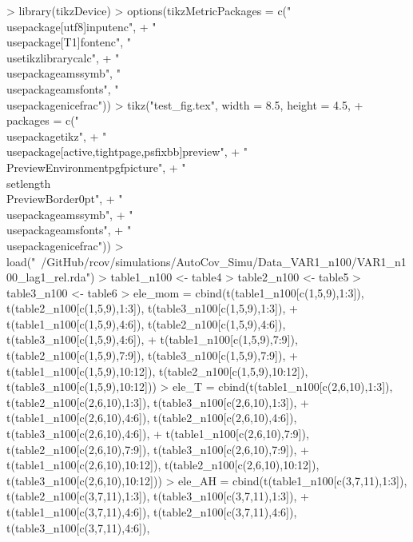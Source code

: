 \documentclass{article}
\begin{document}


\begin{Schunk}
\begin{Sinput}
> library(tikzDevice)
> options(tikzMetricPackages = c("\\usepackage[utf8]{inputenc}",
+     "\\usepackage[T1]{fontenc}", "\\usetikzlibrary{calc}",
+     "\\usepackage{amssymb}", "\\usepackage{amsfonts}", "\\usepackage{nicefrac}"))
> tikz("test_fig.tex", width = 8.5, height = 4.5,
+      packages = c("\\usepackage{tikz}",
+                  "\\usepackage[active,tightpage,psfixbb]{preview}",
+                  "\\PreviewEnvironment{pgfpicture}",
+                  "\\setlength\\PreviewBorder{0pt}",
+                  "\\usepackage{amssymb}",
+                  "\\usepackage{amsfonts}",
+                  "\\usepackage{nicefrac}"))
> load("~/GitHub/rcov/simulations/AutoCov_Simu/Data_VAR1_n100/VAR1_n100_lag1_rel.rda")
> table1_n100 <- table4
> table2_n100 <- table5
> table3_n100 <- table6
> ele_mom = cbind(t(table1_n100[c(1,5,9),1:3]), t(table2_n100[c(1,5,9),1:3]), t(table3_n100[c(1,5,9),1:3]),
+                 t(table1_n100[c(1,5,9),4:6]), t(table2_n100[c(1,5,9),4:6]), t(table3_n100[c(1,5,9),4:6]),
+                 t(table1_n100[c(1,5,9),7:9]), t(table2_n100[c(1,5,9),7:9]), t(table3_n100[c(1,5,9),7:9]),
+                 t(table1_n100[c(1,5,9),10:12]), t(table2_n100[c(1,5,9),10:12]), t(table3_n100[c(1,5,9),10:12]))
> ele_T = cbind(t(table1_n100[c(2,6,10),1:3]), t(table2_n100[c(2,6,10),1:3]), t(table3_n100[c(2,6,10),1:3]),
+               t(table1_n100[c(2,6,10),4:6]), t(table2_n100[c(2,6,10),4:6]), t(table3_n100[c(2,6,10),4:6]),
+               t(table1_n100[c(2,6,10),7:9]), t(table2_n100[c(2,6,10),7:9]), t(table3_n100[c(2,6,10),7:9]),
+               t(table1_n100[c(2,6,10),10:12]), t(table2_n100[c(2,6,10),10:12]), t(table3_n100[c(2,6,10),10:12]))
> ele_AH = cbind(t(table1_n100[c(3,7,11),1:3]), t(table2_n100[c(3,7,11),1:3]), t(table3_n100[c(3,7,11),1:3]),
+                t(table1_n100[c(3,7,11),4:6]), t(table2_n100[c(3,7,11),4:6]), t(table3_n100[c(3,7,11),4:6]),

\end{Sinput}
\end{Schunk}
\end{document}
